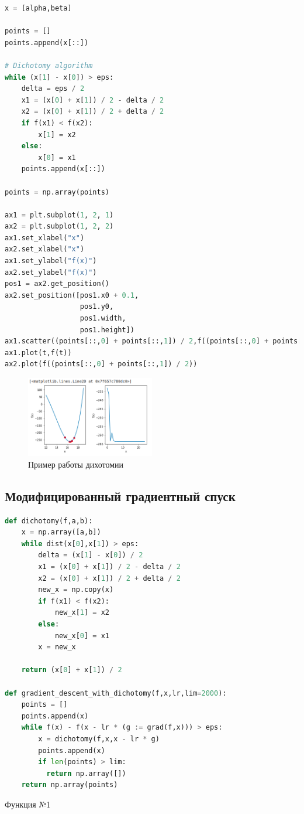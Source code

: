 \begin{lstlisting}[language=Python]
x = [alpha,beta]

points = []
points.append(x[::])

# Dichotomy algorithm
while (x[1] - x[0]) > eps:
    delta = eps / 2
    x1 = (x[0] + x[1]) / 2 - delta / 2
    x2 = (x[0] + x[1]) / 2 + delta / 2
    if f(x1) < f(x2):
        x[1] = x2
    else: 
        x[0] = x1
    points.append(x[::])

points = np.array(points)

ax1 = plt.subplot(1, 2, 1)
ax2 = plt.subplot(1, 2, 2)
ax1.set_xlabel("x")
ax2.set_xlabel("x")
ax1.set_ylabel("f(x)")
ax2.set_ylabel("f(x)")
pos1 = ax2.get_position()
ax2.set_position([pos1.x0 + 0.1,
                  pos1.y0,
                  pos1.width,
                  pos1.height])
ax1.scatter((points[::,0] + points[::,1]) / 2,f((points[::,0] + points[::,1]) / 2,), color='red')
ax1.plot(t,f(t))
ax2.plot(f((points[::,0] + points[::,1]) / 2))
\end{lstlisting}

\begin{figure}[ht]
    \centering
    \includegraphics[width=0.5\textwidth]{images/t22.png}
    \caption{Пример работы дихотомии}
    \label{fig:t222}
\end{figure}

\newpage

\subsection{Модифицированный градиентный спуск}

\begin{lstlisting}[language=Python]
def dichotomy(f,a,b):
    x = np.array([a,b])
    while dist(x[0],x[1]) > eps:
        delta = (x[1] - x[0]) / 2
        x1 = (x[0] + x[1]) / 2 - delta / 2
        x2 = (x[0] + x[1]) / 2 + delta / 2
        new_x = np.copy(x)
        if f(x1) < f(x2):
            new_x[1] = x2
        else:
            new_x[0] = x1
        x = new_x

    return (x[0] + x[1]) / 2
    
def gradient_descent_with_dichotomy(f,x,lr,lim=2000):
    points = []
    points.append(x)
    while f(x) - f(x - lr * (g := grad(f,x))) > eps:
        x = dichotomy(f,x,x - lr * g)
        points.append(x)
        if len(points) > lim:
          return np.array([])
    return np.array(points)
\end{lstlisting}
\newpage
Функция №1

